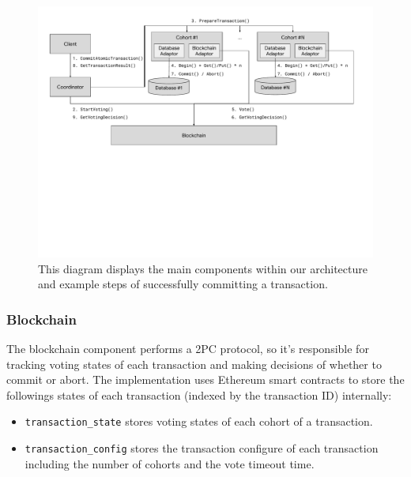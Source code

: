 \documentclass[11pt,sigplan,screen,nonacm]{acmart}
\begin{document}
\begin{figure}
  \centering
  \includegraphics[width=\textwidth]{./diagram.pdf}
  \caption{This diagram displays the main components within our architecture and example steps of successfully committing a transaction.}
  \label{fig:Panel}
\end{figure}

\subsubsection{Blockchain} \label{blockchain}

The blockchain component performs a 2PC protocol, so it’s responsible for tracking voting states of each transaction and making decisions of whether to commit or abort. The implementation uses Ethereum smart contracts to store the followings states of each transaction (indexed by the transaction ID) internally:

\begin{itemize}
  \item \texttt{transaction\_state} stores voting states of each cohort of a transaction.
  \item \texttt{transaction\_config} stores the transaction configure of each transaction including the number of cohorts and the vote timeout time.
\end{itemize}
\end{document}
